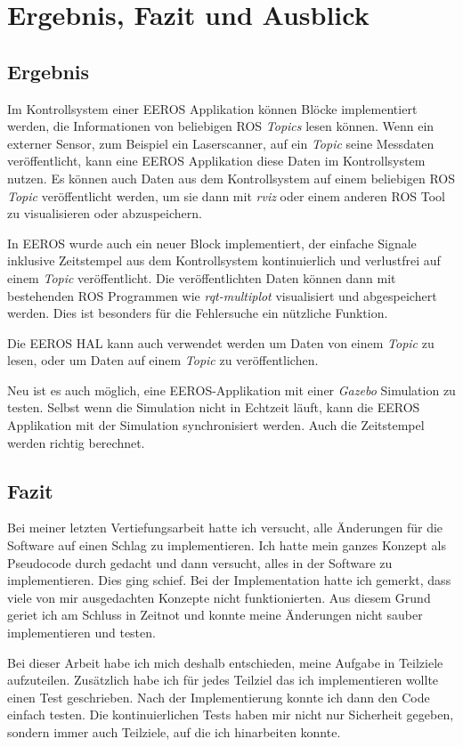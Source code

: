 \chapter{Ergebnis, Fazit und Ausblick}
\section{Ergebnis}
Im Kontrollsystem einer EEROS Applikation können Blöcke implementiert werden, die Informationen von beliebigen ROS \textit{Topics} lesen können.
Wenn ein externer Sensor, zum Beispiel ein Laserscanner, auf ein \textit{Topic} seine Messdaten veröffentlicht, kann eine EEROS Applikation diese Daten im Kontrollsystem nutzen.
Es können auch Daten aus dem Kontrollsystem auf einem beliebigen ROS \textit{Topic} veröffentlicht werden, um sie dann mit \textit{rviz} oder einem anderen ROS Tool zu visualisieren oder abzuspeichern.

In EEROS wurde auch ein neuer Block implementiert, der einfache Signale inklusive Zeitstempel aus dem Kontrollsystem kontinuierlich und verlustfrei auf einem \textit{Topic} veröffentlicht.
Die veröffentlichten Daten können dann mit bestehenden ROS Programmen wie \textit{rqt-multiplot} visualisiert und abgespeichert werden.
Dies ist besonders für die Fehlersuche ein nützliche Funktion.

Die EEROS HAL kann auch verwendet werden um Daten von einem \textit{Topic} zu lesen, oder um Daten auf einem \textit{Topic} zu veröffentlichen.

Neu ist es auch möglich, eine EEROS-Applikation mit einer \textit{Gazebo} Simulation zu testen.
Selbst wenn die Simulation nicht in Echtzeit läuft, kann die EEROS Applikation mit der Simulation synchronisiert werden.
Auch die Zeitstempel werden richtig berechnet.


\section{Fazit}	%
Bei meiner letzten Vertiefungsarbeit hatte ich versucht, alle Änderungen für die Software auf einen Schlag zu implementieren.
Ich hatte mein ganzes Konzept als Pseudocode durch gedacht und dann versucht, alles in der Software zu implementieren.
Dies ging schief.
Bei der Implementation hatte ich gemerkt, dass viele von mir ausgedachten Konzepte nicht funktionierten.
Aus diesem Grund geriet ich am Schluss in Zeitnot und konnte meine Änderungen nicht sauber implementieren und testen.

Bei dieser Arbeit habe ich mich deshalb entschieden, meine Aufgabe in Teilziele aufzuteilen.
Zusätzlich habe ich für jedes Teilziel das ich implementieren wollte einen Test geschrieben.
Nach der Implementierung konnte ich dann den Code einfach testen.
Die kontinuierlichen Tests haben mir nicht nur Sicherheit gegeben, sondern immer auch Teilziele, auf die ich hinarbeiten konnte.

